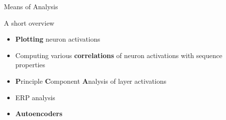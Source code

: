 \begin{frame}{Means of Analysis}
	\begin{block}{A short overview}
		\begin{itemize}
			\item \textbf{Plotting} neuron activations
			\item Computing various \textbf{correlations} of neuron activations with sequence properties
			\item \textbf{P}rinciple \textbf{C}omponent \textbf{A}nalysis of layer activations
			\item ERP analysis
			\item \textbf{Autoencoders}
		\end{itemize}
	\end{block}
\end{frame}